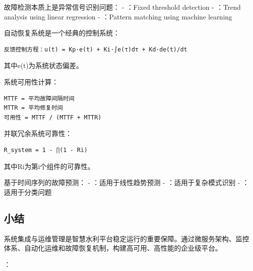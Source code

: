 

故障检测本质上是异常信号识别问题： - ：Fixed threshold detection - ：Trend analysis using linear regression - ：Pattern matching using machine learning


自动恢复系统是一个经典的控制系统：

\begin{lstlisting}
反馈控制方程：u(t) = Kp·e(t) + Ki·∫e(τ)dτ + Kd·de(t)/dt
\end{lstlisting}

其中e(t)为系统状态偏差。


系统可用性计算：

\begin{lstlisting}
MTTF = 平均故障间隔时间
MTTR = 平均修复时间
可用性 = MTTF / (MTTF + MTTR)
\end{lstlisting}


并联冗余系统可靠性：

\begin{lstlisting}
R_system = 1 - ∏(1 - Ri)
\end{lstlisting}

其中Ri为第i个组件的可靠性。


基于时间序列的故障预测： - ：适用于线性趋势预测 - ：适用于复杂模式识别 - ：适用于分类问题

\hypertarget{ux5c0fux7ed3-2}{%
\subsection{小结}\label{ux5c0fux7ed3-2}}

系统集成与运维管理是智慧水利平台稳定运行的重要保障。通过微服务架构、监控体系、自动化运维和故障恢复机制，构建高可用、高性能的企业级平台。

：

